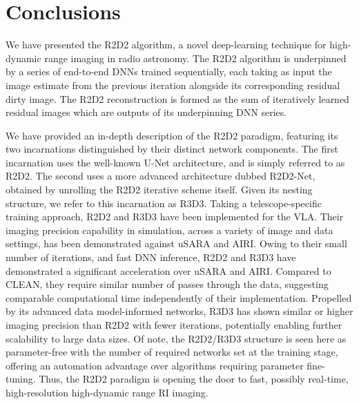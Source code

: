 \documentclass[preprint2,twocolumn]{aastex631}
\begin{document}
{%
\section{Conclusions} \label{sec:Conclusions}
We have presented the R2D2 algorithm, a novel deep-learning technique for high-dynamic range imaging in radio astronomy. The R2D2 algorithm is underpinned by a series of end-to-end DNNs trained sequentially, each taking as input the image estimate from the previous iteration alongside its corresponding residual dirty image. The R2D2 reconstruction is formed as the sum of iteratively learned residual images which are outputs of its underpinning DNN series. 

We have provided an in-depth description of the R2D2 paradigm, featuring its two incarnations distinguished by their distinct network components. The first incarnation uses the well-known U-Net architecture, and is simply referred to as R2D2. The second uses a more advanced architecture dubbed R2D2-Net, obtained by unrolling the R2D2 iterative scheme itself. Given its nesting structure, we refer to this incarnation as R3D3. Taking a telescope-specific training approach, R2D2 and R3D3 have been implemented for the VLA. Their imaging precision capability in simulation, across a variety of image and data settings, has been demonstrated against uSARA and AIRI. Owing to their small number of iterations, and fast DNN inference, R2D2 and R3D3 have demonstrated a significant acceleration over uSARA and AIRI. Compared to CLEAN, they require similar number of passes through the data, suggesting comparable computational time independently of their implementation. Propelled by its advanced data model-informed networks, R3D3 has shown similar or higher imaging precision than R2D2 with fewer iterations, potentially enabling further scalability to large data sizes. Of note, the R2D2/R3D3 structure is seen here as parameter-free with the number of required networks set at the training stage, offering an automation advantage over algorithms requiring parameter fine-tuning. Thus, the R2D2 paradigm is opening the door to fast, possibly real-time, high-resolution high-dynamic range RI imaging. 

}
\end{document}
